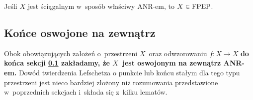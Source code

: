 \begin{wn}\label{wn-sciagalny_w_sp_wlasciwy_to_FPEP}
Jeśli $X$ jest ściągalnym w~sposób właściwy \mbox{ANR-em}, to $X\in\mathrm{FPEP}$.
\end{wn}






\subsection{Końce oswojone na zewnątrz}\label{subsec-fixed_ends_dla_osw_na_zewn}
Obok obowiązujących założeń o~przestrzeni $X$~oraz odwzorowaniu $f\colon X\to X$ \textbf{do końca sekcji \ref{subsec-fixed_ends_dla_osw_na_zewn} zakładamy, że $X$~jest oswojonym na zewnątrz \mbox{ANR-em}.} Dowód twierdzenia Lefschetza o punkcie lub końcu stałym dla tego typu przestrzeni jest nieco bardziej złożony niż rozumowania przedstawione w~poprzednich sekcjach i~składa się z~kilku lematów.

